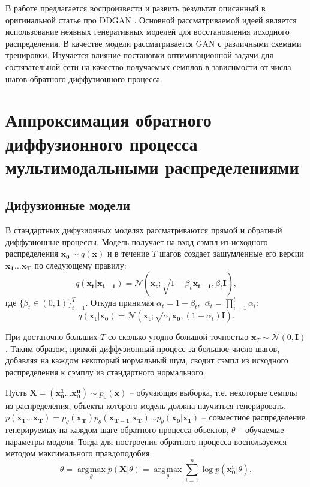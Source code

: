 \documentclass{article}
\DeclareMathOperator*{\argmax}{\arg\!\max}
\begin{document}
 В работе предлагается воспроизвести и развить результат описанный в оригинальной статье про DDGAN \cite{https://doi.org/10.48550/arxiv.2112.07804}. Основной рассматриваемой идеей является использование неявных генеративных моделей для восстановления исходного распределения. В качестве модели рассматривается GAN с различными схемами тренировки. Изучается влияние постановки оптимизационной задачи для состязательной сети на качество получаемых семплов в зависимости от числа шагов обратного диффузионного процесса.
 
 
 \section{Аппроксимация обратного диффузионного процесса мультимодальными распределениями}
 \subsection{Дифузионные модели}
 В стандартных дифузионных моделях \cite{https://doi.org/10.48550/arxiv.1503.03585, https://doi.org/10.48550/arxiv.2006.11239} рассматриваются прямой и обратный диффузионные процессы. Модель получает на вход сэмпл из исходного распределения $\mathbf{x_0}\sim q(\mathbf{x})$ и в течение $T$ шагов создает зашумленные его версии $\mathbf{x_1}\dots \mathbf{x_T}$ по следующему правилу:
 \begin{equation}
 	q(\mathbf{x_t}|\mathbf{x_{t-1}}) = \mathcal{N}(\mathbf{x_t}; \sqrt{1-\beta_t}\mathbf{x_{t-1}}, \beta_t \mathbf{I}),
 \end{equation}
где $\{\beta_t \in (0, 1)\}_{t=1}^T$. Откуда принимая $\alpha_t = 1 - \beta_t,~~\overline{\alpha_t} = \prod_{i=1}^t \alpha_i$:
 \begin{equation}
	q(\mathbf{x_t}|\mathbf{x_0}) = \mathcal{N}(\mathbf{x_t}; \sqrt{\overline{\alpha_t}}\mathbf{x_0}, (1-\overline{\alpha_t})\mathbf{I}).
\end{equation}

При достаточно больших $T$ со сколько угодно большой точностью $\mathbf{x}_T\sim \mathcal{N}(0,\mathbf{I})$. Таким образом, прямой диффузионный процесс за большое число шагов, добавляя на каждом некоторый нормальный шум, сводит сэмпл из исходного распределения к сэмплу из стандартного нормального. 

Пусть $\mathbf{X} = (\mathbf{x_0^1}\dots \mathbf{x_0^n})\sim p_0(\mathbf{x})$ -- обучающая выборка, т.е. некоторые семплы из распределения, объекты которого модель должна научиться генерировать. $p(\mathbf{x_1}\dots \mathbf{x_T}) = p_\theta(\mathbf{x_T})p_\theta(\mathbf{x_{T-1}}|\mathbf{x_T})\dots p_\theta(\mathbf{x_0}|\mathbf{x_1})$ -- совместное распределение генерируемых на каждом шаге обратного процесса объектов, $\theta$ -- обучаемые параметры модели. Тогда для построения обратного процесса воспользуемся методом максимального правдоподобия:
 \begin{equation}
	\theta =\argmax\limits_{\theta} p(\mathbf{X}|\theta) = \argmax\limits_{\theta} \sum\limits_{i=1}^n \log{p(\mathbf{x_0^i}|\theta)},
\end{equation}
\end{document}
